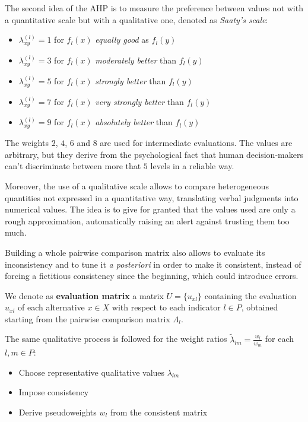 The second idea of the AHP is to measure the preference between values not with a quantitative scale but with a qualitative one, denoted as \textit{Saaty's scale}:
\begin{itemize}
	\item $\lambda_{xy}^{(l)} = 1$ for $f_l (x)$ \textit{equally good} as $f_l (y)$
	
	\item $\lambda_{xy}^{(l)} = 3$ for $f_l (x)$ \textit{moderately better} than $f_l (y)$
	
	\item $\lambda_{xy}^{(l)} = 5$ for $f_l (x)$ \textit{strongly better} than $f_l (y)$
	
	\item $\lambda_{xy}^{(l)} = 7$ for $f_l (x)$ \textit{very strongly better} than $f_l (y)$
	
	\item $\lambda_{xy}^{(l)} = 9$ for $f_l (x)$ \textit{absolutely better} than $f_l (y)$
\end{itemize}

The weights $2$, $4$, $6$ and $8$ are used for intermediate evaluations. The values are arbitrary, but they derive from the psychological fact that human decision-makers can't discriminate between more that $5$ levels in a reliable way.

Moreover, the use of a qualitative scale allows to compare heterogeneous quantities not expressed in a quantitative way, translating verbal judgments into numerical values. The idea is to give for granted that the values used are only a rough approximation, automatically raising an alert against trusting them too much. 

Building a whole pairwise comparison matrix also allows to evaluate its inconsistency and to tune it \textit{a posteriori} in order to make it consistent, instead of forcing a fictitious consistency since the beginning, which could introduce errors. \\

\begin{definition}
	We denote as \textbf{evaluation matrix} a matrix $U = \{u_{xl}\}$ containing the evaluation $u_{xl}$ of each alternative $x \in X$ with respect to each indicator $l \in P$, obtained starting from the pairwise comparison matrix $\Lambda_l$.
\end{definition}

The same qualitative process is followed for the weight ratios $\tilde \lambda_{lm} = \frac{w_l}{w_m}$ for each $l,m \in P$:
\begin{itemize}
	\item Choose representative qualitative values $\lambda_{lm}$
	
	\item Impose consistency 
	
	\item Derive pseudoweights $w_l$ from the consistent matrix
\end{itemize}

